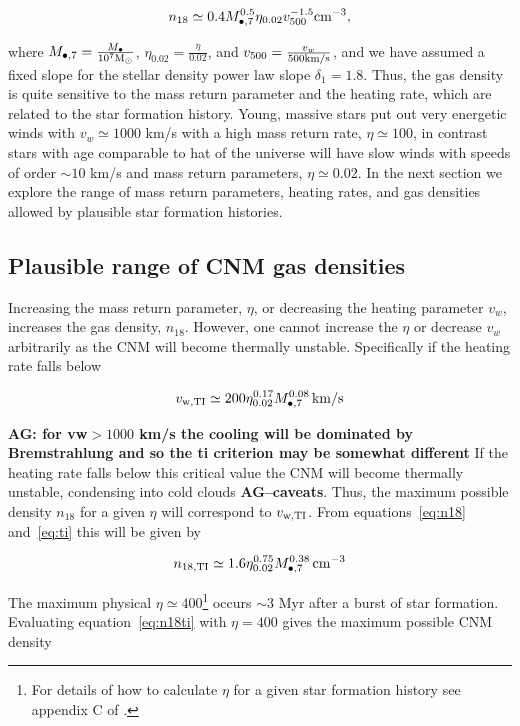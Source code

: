\documentclass[usenatbib,fleqn]{mnras}
\newcommand{\Mbh}[1][]{M_{\bullet#1}}
\newcommand{\Msun}{{\rm M_\odot}}
\begin{document}
\begin{equation}
n_{18}\simeq 0.4 \Mbh[,7]^{0.5} \eta_{0.02} v_{500}^{-1.5} {\rm
  cm^{-3}},
\label{eq:n18}
\end{equation}

where $\Mbh[,7]=\frac{\Mbh}{10^7 \Msun}$,
$\eta_{0.02}=\frac{\eta}{0.02}$, and $v_{500}=\frac{v_w}{500 {\rm
    km/s}}$, and we have assumed a fixed slope for the stellar density
power law slope $\delta_1=1.8$. Thus, the gas density is quite
sensitive to the mass return parameter and the heating rate, which are
related to the star formation history. Young, massive stars put out
very energetic winds with $v_w\simeq 1000$ km/s with a high mass
return rate, $\eta\simeq 100$, in contrast stars with age comparable
to hat of the universe will have slow winds with speeds of order $\sim
10$ km/s and mass return parameters, $\eta\simeq0.02$. In the next
section we explore the range of mass return parameters, heating rates,
and gas densities allowed by plausible star formation histories.

\subsection{Plausible range of CNM gas densities}
Increasing the mass return parameter, $\eta$, or decreasing the
heating parameter $v_w$, increases the gas density, $n_{18}$.
However, one cannot increase the $\eta$ or decrease $v_w$ arbitrarily
as the CNM will become thermally unstable. Specifically if the heating
rate falls below

\begin{equation}
v_{\rm w,TI}\simeq 200 \eta_{0.02}^{0.17} \Mbh[,7]^{0.08} \,{\rm km/s} 
\label{eq:ti}
\end{equation}

{\bf AG: for vw$>1000$ km/s the cooling will be dominated by
  Bremstrahlung and so the ti criterion may be somewhat different} If
the heating rate falls below this critical value the CNM will become
thermally unstable, condensing into cold clouds {\bf
  AG--caveats}. Thus, the maximum possible density $n_{18}$ for a
given $\eta$ will correspond to $v_{\rm w,TI}$. From
equations~\eqref{eq:n18} and~\eqref{eq:ti} this will be given by

\begin{equation}
n_{\rm 18,TI}\simeq 1.6 \eta_{0.02}^{0.75} \Mbh[,7]^{0.38} \, {\rm cm^{-3}}
\label{eq:n18ti}
\end{equation}

The maximum physical $\eta\simeq 400$\footnote{For details
  of how to calculate $\eta$ for a given star formation history see
  appendix C of \citet{Generozov+2015}.} occurs $\sim 3$ Myr after a
burst of star formation. Evaluating equation~\eqref{eq:n18ti} with
$\eta=400$ gives the maximum possible CNM density
\end{document}
